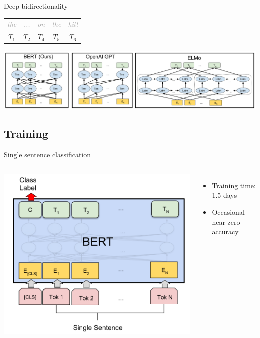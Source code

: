 \documentclass[pdf]{beamer}
\newcommand{\demo}[1]{\textit{\textcolor{darkgray}{#1}}}
\begin{document}
    \begin{frame}{Deep bidirectionality}
        \begin{center}
            \begin{tabular}{c c c c c}
                \demo{the} & \demo{...} & \demo{on} & \demo{the} & \demo{hill} \\
                $T_1$ & $T_2$ & $T_4$ & $T_5$ & $T_6$
            \end{tabular}
        \end{center}

        \includegraphics[width=\textwidth]{../figures/deeply_bidirectional.png}
    \end{frame}

    \subsection{Training}
    \begin{frame}{Single sentence classification}
        \begin{columns}
            \begin{center}
                \includegraphics[height=0.87\textheight]{../figures/bert_single_sentence.png}
            \end{center}
            \begin{itemize}
                \item Training time: 1.5 days
                \item Occasional near zero accuracy
            \end{itemize}
        \end{columns}
    \end{frame}
\end{document}
